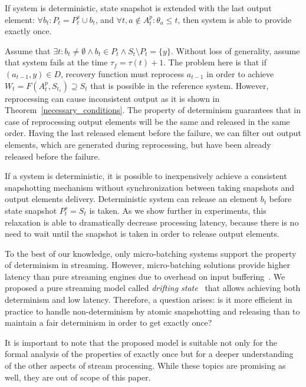 \begin{theorem}
\label{determinism}
If system is deterministic, state snapshot is extended with the last output element: $\forall{b_t}:P_t=P^{s}_t \cup b_t$, and $\forall{t,a}\notin{A^{p}_t} : \theta_a \leq t$, then system is able to provide exactly once.
\end{theorem}
\begin{sketch}
Assume that $\exists{t}:b_t\neq{\emptyset} \wedge b_t \in P_t \wedge S_{t}\setminus{P_t}=\{y\}$. Without loss of generality, assume that system fails at the time $\tau_f = \tau(t)+1$. The problem here is that if $(a_{t-1},y)\in{D}$, recovery function must reprocess $a_{t-1}$ in order to achieve $W_t=F(A^{p}_t,S_{t_s})\supseteq{S_t}$ that is possible in the reference system. However, reprocessing can cause inconsistent output as it is shown in Theorem~\ref{necessary_conditions}. The property of determinism guarantees that in case of reprocessing output elements will be the same and released in the same order. Having the last released element before the failure, we can filter out output elements, which are generated during reprocessing, but have been already released before the failure.
\end{sketch}

If a system is deterministic, it is possible to inexpensively achieve a consistent snapshotting mechanism without synchronization between taking snapshots and output elements delivery. Deterministic system can release an element $b_t$ before state snapshot $P^{s}_t=S_t$ is taken. As we show further in experiments, this relaxation is able to dramatically decrease processing latency, because there is no need to wait until the snapshot is taken in order to release output elements.

To the best of our knowledge, only micro-batching systems support the property of determinism in streaming. However, micro-batching solutions provide higher latency than pure streaming engines due to overhead on input buffering~\cite{karimov2018benchmarking}. We proposed a pure streaming model called {\em drifting state}~\cite{we2018adbis} that allows achieving both determinism and low latency. Therefore, a question arises: is it more efficient in practice to handle non-determinism by atomic snapshotting and releasing than to maintain a fair determinism in order to get exactly once? 

It is important to note that the proposed model is suitable not only for the formal analysis of the properties of exactly once but for a deeper understanding of the other aspects of stream processing. While these topics are promising as well, they are out of scope of this paper. 

